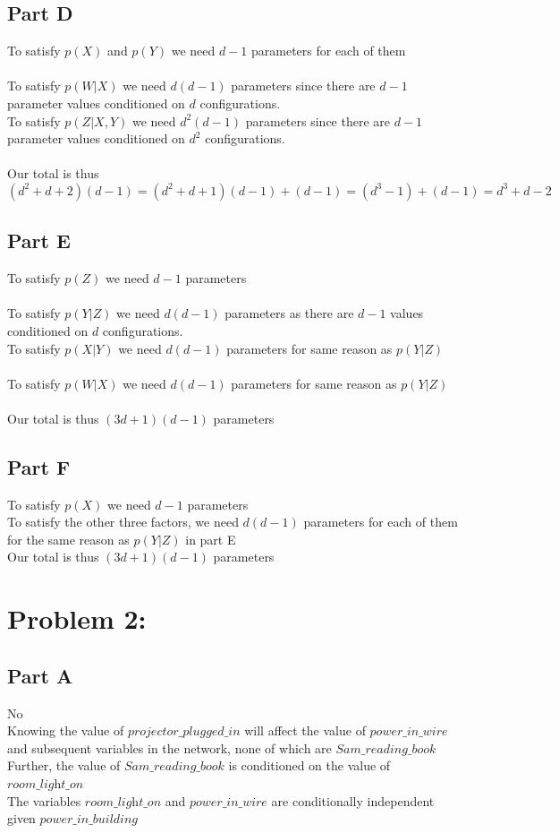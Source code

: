 \documentclass[twoside,11pt]{article}
\theoremstyle{definition}
\begin{document}
\subsection*{Part D}

To satisfy $p(X)$ and $p(Y)$ we need $d-1$ parameters for each of them\\
\\
To satisfy $p(W|X)$ we need $d(d-1)$ parameters since there are $d-1$ parameter values conditioned on $d$ configurations. \\
To satisfy $p(Z|X,Y)$ we need $d^2(d-1)$ parameters since there are $d-1$ parameter values conditioned on $d^2$ configurations.\\
\\
Our total is thus
\[
(d^2+d+2)(d-1) = (d^2+d+1)(d-1) + (d-1) = (d^3-1) + (d-1) = d^3 + d - 2
\]

\subsection*{Part E}

To satisfy $p(Z)$ we need $d-1$ parameters\\
\\
To satisfy $p(Y|Z)$ we need $d(d-1)$ parameters as there are $d-1$ values conditioned on $d$ configurations. \\
To satisfy $p(X|Y)$ we need $d(d-1)$ parameters for same reason as $p(Y|Z)$\\
\\
To satisfy $p(W|X)$ we need $d(d-1)$ parameters for same reason as $p(Y|Z)$\\
\\
Our total is thus $(3d+1)(d-1)$ parameters

\subsection*{Part F}

To satisfy $p(X)$ we need $d-1$ parameters\\
To satisfy the other three factors, we need $d(d-1)$ parameters for each of them for the same reason as $p(Y|Z)$ in part E\\
Our total is thus $(3d+1)(d-1)$ parameters

\section*{Problem 2:}

\subsection*{Part A}
No\\
Knowing the value of $\textit{projector\_plugged\_in}$ will affect the value of $\textit{power\_in\_wire}$ and subsequent variables in the network, none of which are $\textit{Sam\_reading\_book}$\\
Further, the value of $\textit{Sam\_reading\_book}$ is conditioned on the value of $\textit{room\_light\_on}$\\
The variables $\textit{room\_light\_on}$ and $\textit{power\_in\_wire}$ are conditionally independent given $\textit{power\_in\_building}$
\end{document}

